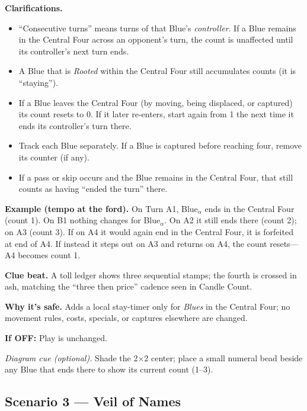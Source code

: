 \documentclass[11pt]{article}
\begin{document}
\medskip
\noindent\textbf{Clarifications.}
\begin{itemize}\setlength\itemsep{0.25em}
  \item “Consecutive turns” means turns of that Blue’s \emph{controller}. If a Blue remains in the Central Four across an opponent’s turn, the count is unaffected until its controller’s next turn ends.
  \item A Blue that is \emph{Rooted} within the Central Four still accumulates counts (it is “staying”).
  \item If a Blue leaves the Central Four (by moving, being displaced, or captured) its count resets to 0. If it later re-enters, start again from 1 the next time it ends its controller’s turn there.
  \item Track each Blue separately. If a Blue is captured before reaching four, remove its counter (if any).
  \item If a pass or skip occurs and the Blue remains in the Central Four, that still counts as having “ended the turn” there.
\end{itemize}

\medskip
\noindent\textbf{Example (tempo at the ford).}  
On Turn A1, Blue\(_\alpha\) ends in the Central Four (count 1). On B1 nothing changes for Blue\(_\alpha\). On A2 it still ends there (count 2); on A3 (count 3). If on A4 it would again end in the Central Four, it is forfeited at end of A4. If instead it steps out on A3 and returns on A4, the count resets—A4 becomes count 1.

\medskip
\noindent\textbf{Clue beat.} A toll ledger shows three sequential stamps; the fourth is crossed in ash, matching the “three then price” cadence seen in Candle Count.

\medskip
\noindent\textbf{Why it’s safe.} Adds a local stay-timer only for \emph{Blues} in the Central Four; no movement rules, costs, specials, or captures elsewhere are changed.

\medskip
\noindent\textbf{If \textsc{OFF}:} Play is unchanged.

\medskip
\noindent\textit{Diagram cue (optional).} Shade the 2\(\times\)2 center; place a small numeral bead beside any Blue that ends there to show its current count (1–3).

\subsection{Scenario 3 — Veil of Names}
\label{scen:veil-of-names}
\end{document}
